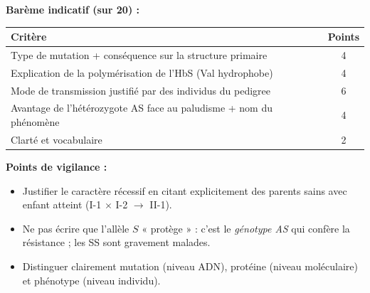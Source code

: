 \documentclass[11pt]{article}
\begin{document}
\begin{corrige}
\textbf{Barème indicatif (sur 20) :}
\begin{center}
\begin{tabular}{|l|c|}\hline
\rowcolor{popblueL} \textbf{Critère} & \textbf{Points} \\ \hline
Type de mutation + conséquence sur la structure primaire & 4 \\ \hline
Explication de la polymérisation de l'HbS (Val hydrophobe) & 4 \\ \hline
Mode de transmission justifié par des individus du pedigree & 6 \\ \hline
Avantage de l'hétérozygote AS face au paludisme + nom du phénomène & 4 \\ \hline
Clarté et vocabulaire & 2 \\ \hline
\end{tabular}
\end{center}

\textbf{Points de vigilance :}
\begin{itemize}
    \item Justifier le caractère récessif en citant explicitement des parents sains avec enfant atteint (I-1 $\times$ I-2 $\to$ II-1).
    \item Ne pas écrire que l'allèle $S$ « protège » : c'est le \emph{génotype AS} qui confère la résistance ; les SS sont gravement malades.
    \item Distinguer clairement mutation (niveau ADN), protéine (niveau moléculaire) et phénotype (niveau individu).
\end{itemize}
\end{corrige}
\end{document}
